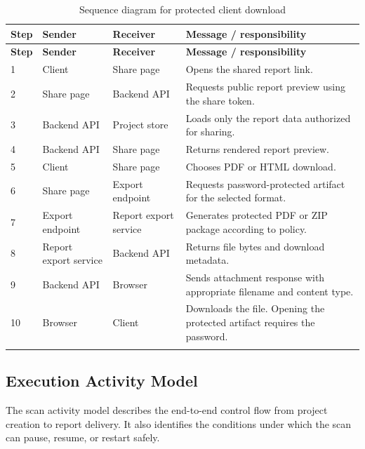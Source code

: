 \documentclass[12pt,a4paper]{report}
\begin{document}
\begin{longtable}{|p{}|p{}|p{}|p{}|}
\hline
\textbf{Step} & \textbf{Sender} & \textbf{Receiver} & \textbf{Message / responsibility} \\
\hline
\endfirsthead
\hline
\textbf{Step} & \textbf{Sender} & \textbf{Receiver} & \textbf{Message / responsibility} \\
\hline
\endhead
1 & Client & Share page & Opens the shared report link. \\
\hline
2 & Share page & Backend API & Requests public report preview using the share token. \\
\hline
3 & Backend API & Project store & Loads only the report data authorized for sharing. \\
\hline
4 & Backend API & Share page & Returns rendered report preview. \\
\hline
5 & Client & Share page & Chooses PDF or HTML download. \\
\hline
6 & Share page & Export endpoint & Requests password-protected artifact for the selected format. \\
\hline
7 & Export endpoint & Report export service & Generates protected PDF or ZIP package according to policy. \\
\hline
8 & Report export service & Backend API & Returns file bytes and download metadata. \\
\hline
9 & Backend API & Browser & Sends attachment response with appropriate filename and content type. \\
\hline
10 & Browser & Client & Downloads the file. Opening the protected artifact requires the password. \\
\hline
\caption{Sequence diagram for protected client download}
\label{tab:seq_client_download}
\end{longtable}

\subsection{Execution Activity Model}

The scan activity model describes the end-to-end control flow from project creation to
report delivery. It also identifies the conditions under which the scan can pause,
resume, or restart safely.
\end{document}
